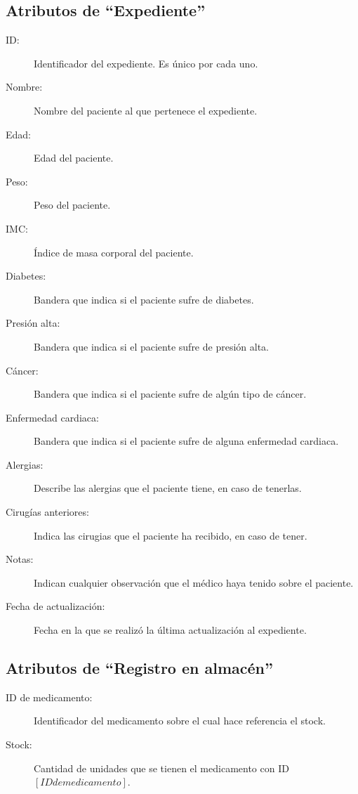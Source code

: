 \subsection{Atributos de ``Expediente''}

\begin{description}
	\item[ID: ] Identificador del expediente. Es \'unico por cada uno.
	\item[Nombre: ] Nombre del paciente al que pertenece el expediente.
	\item[Edad: ] Edad del paciente.
	\item[Peso: ] Peso del paciente.
	\item[IMC: ] \'Indice de masa corporal del paciente.
	\item[Diabetes: ] Bandera que indica si el paciente sufre de diabetes.
	\item[Presi\'on alta: ] Bandera que indica si el paciente sufre de presi\'on alta.
	\item[C\'ancer: ] Bandera que indica si el paciente sufre de alg\'un tipo de c\'ancer.
	\item[Enfermedad cardiaca: ] Bandera que indica si el paciente sufre de alguna enfermedad cardiaca.
	\item[Alergias: ] Describe las alergias que el paciente tiene, en caso de tenerlas.
	\item[Cirug\'ias anteriores: ] Indica las cirugias que el paciente ha recibido, en caso de tener. 
	\item[Notas: ] Indican cualquier observaci\'on que el m\'edico haya tenido sobre el paciente.
	\item[Fecha de actualizaci\'on: ] Fecha en la que se realiz\'o la \'ultima actualizaci\'on al expediente.
\end{description}

\subsection{Atributos de ``Registro en almac\'en''}

\begin{description}
	\item[ID de medicamento: ] Identificador del medicamento sobre el cual hace referencia el stock.
	\item[Stock: ] Cantidad de unidades que se tienen el medicamento con ID $[ID de medicamento]$.
\end{description}
